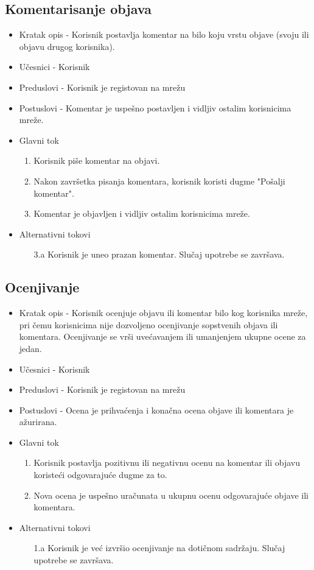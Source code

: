 \subsection{Komentarisanje objava}
\begin{itemize}
	\item Kratak opis - Korisnik postavlja komentar na bilo koju vrstu objave (svoju ili objavu drugog korisnika). 
	\item Učesnici - Korisnik
	\item Preduslovi - Korisnik je registovan na mrežu
	\item Postuslovi - Komentar je uspešno postavljen i vidljiv ostalim korisnicima mreže.
	\item Glavni tok
	\begin{enumerate}
		\item Korisnik piše komentar na objavi.
		\item Nakon završetka pisanja komentara, korisnik koristi dugme "Pošalji komentar". 
		\item Komentar je objavljen i vidljiv ostalim korisnicima mreže.
	\end{enumerate}
	\item Alternativni tokovi
    \begin{itemize}
		\item[3.a] Korisnik je uneo prazan komentar. Slučaj upotrebe se završava.
	\end{itemize}
\end{itemize}

\subsection{Ocenjivanje}
\begin{itemize}
	\item Kratak opis - Korisnik ocenjuje objavu ili komentar bilo kog korisnika mreže, pri čemu korisnicima nije dozvoljeno ocenjivanje sopstvenih objava ili komentara. Ocenjivanje se vrši uvećavanjem ili umanjenjem ukupne ocene za jedan.
	\item Učesnici - Korisnik
	\item Preduslovi - Korisnik je registovan na mrežu
	\item Postuslovi - Ocena je prihvaćenja i konačna ocena objave ili komentara je ažurirana.
	\item Glavni tok
	\begin{enumerate}
		\item Korisnik postavlja pozitivnu ili negativnu ocenu na komentar ili objavu koristeći odgovarajuće dugme za to.
		\item Nova ocena je uspešno uračunata u ukupnu ocenu odgovarajuće objave ili komentara.
	\end{enumerate}
	\item Alternativni tokovi
    \begin{itemize}
		\item[1.a] Korisnik je već izvršio ocenjivanje na dotičnom sadržaju. Slučaj upotrebe se završava.
	\end{itemize}
\end{itemize}

